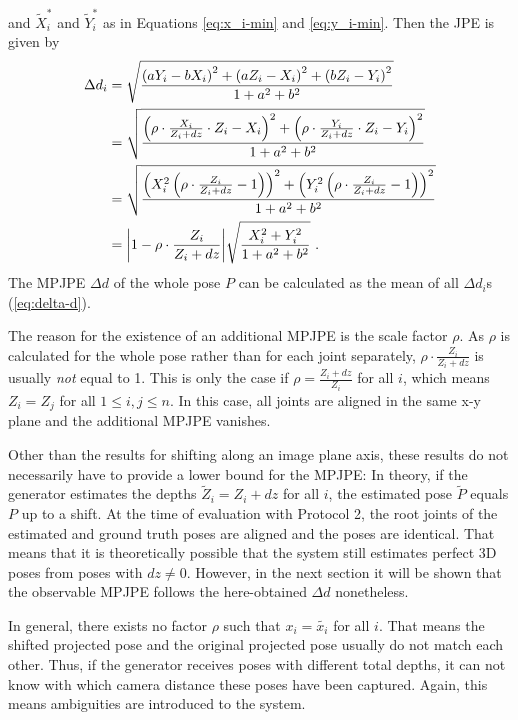 and $\widetilde{X}_i^\ast$ and $\widetilde{Y}_i^\ast$ as in Equations \eqref{eq:x_i-min} and \eqref{eq:y_i-min}.
Then the JPE  is given by 
\begin{align}
	\label{eq:z-shift-error}
	\Delta d_i &= \sqrt{\frac{\left (a Y_i - b X_i \right )^2 + \left (a Z_i - X_i \right )^2 + \left (b Z_i - Y_i \right )^2}{1 + a^2 + b^2}} \\ 
	&= \sqrt{\frac{\left (\rho \cdot \frac{X_i}{Z_i + dz}\cdot Z_i - X_i \right )^2 + \left (\rho \cdot \frac{Y_i }{Z_i + dz}\cdot Z_i- Y_i \right )^2}{1 + a^2 + b^2}} \\
	&= \sqrt{\frac{\left (X_i^2 \left (\rho \cdot \frac{Z_i}{Z_i + dz} - 1 \right) \right )^2 + \left (Y_i^2 \left (\rho \cdot \frac{Z_i}{Z_i + dz}-1 \right ) \right )^2}{1 + a^2 + b^2}} \\
	&= \abs{1 - \rho \cdot \frac{Z_i}{Z_i + dz}}  \sqrt{\frac{X_i^2 + Y_i^2}{1 + a^2 + b^2}}\ .
\end{align}
The MPJPE $\Delta d$ of the whole pose $P$ can be calculated as the mean of all $\Delta d_i$s (\autoref{eq:delta-d}).

The reason for the existence of an additional MPJPE is the scale factor $\rho$.
As $\rho$ is calculated for the whole pose rather than for each joint separately, $\rho \cdot \frac{Z_i}{Z_i + dz}$ is usually \emph{not} equal to 1.
This is only the case if $\rho = \frac{Z_i + dz}{Z_i}$ for all $i$, which means $Z_i = Z_j$ for all $1 \leq i, j \leq n$.
In this case, all joints are aligned in the same x-y plane and the additional MPJPE vanishes.

Other than the results for shifting along an image plane axis, these results do not necessarily have to provide a lower bound for the MPJPE:
In theory, if the generator estimates the depths $\widetilde{Z}_i = Z_i + dz$ for all $i$, the estimated pose $\widetilde{P}$ equals $P$ up to a shift.
At the time of evaluation with Protocol 2, the root joints of the estimated and ground truth poses are aligned and the poses are identical.
That means that it is theoretically possible that the system still estimates perfect 3D poses from poses with $dz \neq 0$.
However, in the next section it will be shown that the observable MPJPE follows the here-obtained $\Delta d$ nonetheless.

In general, there exists no factor $\rho$ such that $x_i = \widetilde{x_i}$ for all $i$.
That means the shifted projected pose and the original projected pose usually do not match each other.
Thus, if the generator receives poses with different total depths, it can not know with which camera distance these poses have been captured.
Again, this means ambiguities are introduced to the system.

